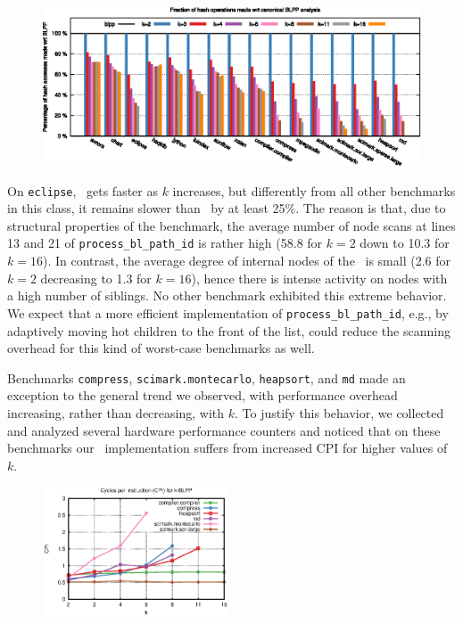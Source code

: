 \ifdefined\noauthorea
\begin{figure}[!ht]
\begin{center}
\includegraphics[width=\textwidth]{figures/kblpp-hash/kblpp-hash.eps}
\caption{\protect}
\end{center}
\end{figure}
\fi

On {\tt eclipse}, \kblpp\ gets faster as $k$ increases, but differently from all other benchmarks in this class, it remains slower than \blpp\ by at least 25\%. The reason is that, due to structural properties of the benchmark, the average number of node scans at lines 13 and 21 of {\tt process\_bl\_path\_id} is rather high (58.8 for $k=2$ down to 10.3 for $k=16$). In contrast, the average degree of internal nodes of the \ksf\ is small (2.6 for $k=2$ decreasing to 1.3 for $k=16$), hence there is intense activity on nodes with a high number of siblings. No other benchmark exhibited this extreme behavior. We expect that a more efficient implementation of {\tt process\_bl\_path\_id}, e.g., by adaptively moving hot children to the front of the list, could reduce the scanning overhead for this kind of worst-case benchmarks as well.

Benchmarks {\tt compress}, {\tt scimark.montecarlo}, {\tt heapsort}, and {\tt md} made an exception to the general trend we observed, with performance overhead increasing, rather than decreasing, with $k$. To justify this behavior, we collected and analyzed several hardware performance counters and noticed that on these benchmarks our \kblpp\ implementation suffers from increased CPI for higher values of $k$.

\ifdefined\noauthorea
\begin{figure}[!ht]
\begin{center}
\includegraphics[width=0.49\textwidth]{figures/kblpp-cpi/kblpp-cpi.eps}
\caption{\protect}
\end{center}
\end{figure}
\fi

